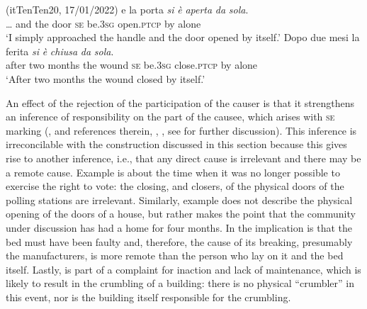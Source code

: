 \documentclass[output=paper,colorlinks,citecolor=brown
]{langscibook}
\begin{document}
\hspace*{\fill}(itTenTen20, 17/01/2022)\quad
\ea \label{bentley_example_33}
    \ea \label{bentley_example_33a}
     	e				la		porta	\textit{si}		\textit{è}							\textit{aperta}				\textit{da} \textit{sola}.	\\
    {\ldots} and	the	door		\textsc{se}		be.3\textsc{sg}		open.\textsc{ptcp}	by	alone \\
    \glt 					‘I simply approached the handle and the door opened by itself.’
    \ex \label{bentley_example_33b}
    \gll Dopo		due	mesi			la		ferita			\textit{si} 		\textit{è }						\textit{chiusa} 			\textit{da} \textit{sola}. \\
				after			two	months	the	wound		\textsc{se}		be.3\textsc{sg}		close.\textsc{ptcp}	by	alone\\
    \glt 				‘After two months the wound closed by itself.’
    \z
\z

An effect of the rejection of the participation of the causer is that it strengthens an inference of responsibility on the part of the causee, which arises with \textsc{se} marking (\cite{zribi1987reflexivite}, and references therein, \cite{kailuweit2012construcciones}, \cite{martin2014anticausatives}, see  for further discussion). This inference is irreconcilable with the construction discussed in this section because this gives rise to another inference, i.e., that any direct cause is irrelevant and there may be a remote cause. Example  is about the time when it was no longer possible to exercise the right to vote: the closing, and closers, of the physical doors of the polling stations are irrelevant. Similarly, example  does not describe the physical opening of the doors of a house, but rather makes the point that the community under discussion has had a home for four months. In  the implication is that the bed must have been faulty and, therefore, the cause of its breaking, presumably the manufacturers, is more remote than the person who lay on it and the bed itself. Lastly,  is part of a complaint for inaction and lack of maintenance, which is likely to result in the crumbling of a building: there is no physical “crumbler” in this event, nor is the building itself responsible for the crumbling.
\end{document}
